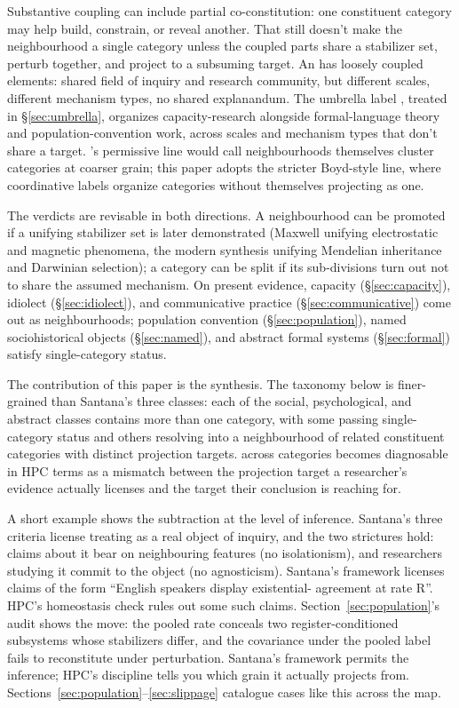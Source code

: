 \documentclass[12pt]{article}
\begin{document}
Substantive coupling can include partial co-constitution: one constituent category may help build, constrain, or reveal another. That still doesn't make the neighbourhood a single category unless the coupled parts share a stabilizer set, perturb together, and project to a subsuming target. An  has loosely coupled elements: shared field of inquiry and research community, but different scales, different mechanism types, no shared explanandum. The umbrella label , treated in §\ref{sec:umbrella}, organizes capacity-research alongside formal-language theory and population-convention work, across scales and mechanism types that don't share a target. \citeauthor{khalidi2013}'s permissive line would call neighbourhoods themselves cluster categories at coarser grain; this paper adopts the stricter Boyd-style line, where coordinative labels organize categories without themselves projecting as one.

The verdicts are revisable in both directions. A neighbourhood can be promoted if a unifying stabilizer set is later demonstrated (Maxwell unifying electrostatic and magnetic phenomena, the modern synthesis unifying Mendelian inheritance and Darwinian selection); a category can be split if its sub-divisions turn out not to share the assumed mechanism. On present evidence, capacity (§\ref{sec:capacity}), idiolect (§\ref{sec:idiolect}), and communicative practice (§\ref{sec:communicative}) come out as neighbourhoods; population convention (§\ref{sec:population}), named sociohistorical objects (§\ref{sec:named}), and abstract formal systems (§\ref{sec:formal}) satisfy single-category status.

The contribution of this paper is the synthesis. The taxonomy below is finer-grained than Santana's three classes: each of the social, psychological, and abstract classes contains more than one category, with some passing single-category status and others resolving into a neighbourhood of related constituent categories with distinct projection targets.  across categories becomes diagnosable in HPC terms as a mismatch between the projection target a researcher's evidence actually licenses and the target their conclusion is reaching for.

A short example shows the subtraction at the level of inference. Santana's three criteria license treating  as a real object of inquiry, and the two strictures hold: claims about it bear on neighbouring features (no isolationism), and researchers studying it commit to the object (no agnosticism). Santana's framework licenses claims of the form \enquote{English speakers display existential- agreement at rate R}. HPC's homeostasis check rules out some such claims. Section~\ref{sec:population}'s audit shows the move: the pooled rate conceals two register-conditioned subsystems whose stabilizers differ, and the covariance under the pooled label fails to reconstitute under perturbation. Santana's framework permits the inference; HPC's discipline tells you which grain it actually projects from. Sections~\ref{sec:population}--\ref{sec:slippage} catalogue cases like this across the map.
\end{document}
